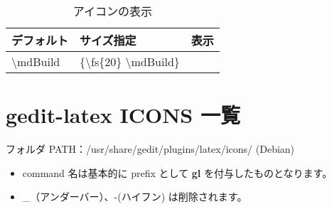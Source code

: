 \documentclass[10pt]{ltjarticle}
\def\fs#1{\fontsize{#1pt}{14pt}\selectfont}
\newcommand{\mdBuild}{}
\begin{document}
\begin{table}[H]
\centering
\caption{アイコンの表示}
\begin{tabular}{lll}
デフォルト & サイズ指定 & 表示\\
\hline
\textbackslash mdBuild & \{\textbackslash fs\{20\} \textbackslash mdBuild\} & {\fs{20} \mdBuild}\\
\end{tabular}
\end{table}

\newpage

\section{gedit-latex ICONS 一覧}

\hspace{4mm} フォルダ PATH：/usr/share/gedit/plugins/latex/icons/ (Debian)

\begin{itemize}
  \item command 名は基本的に prefix として \textbf{gl} を付与したものとなります。\vspace{-2mm}
  \item \_（アンダーバー）、-(ハイフン) は削除されます。
\end{itemize}
\end{document}
